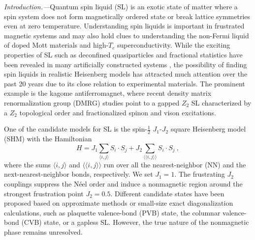 \documentclass[prl,aps,epsf,showpacs,twocolumn]{revtex4}
\begin{document}
\textit{Introduction.---}Quantum spin liquid (SL) is an exotic state of matter where a spin system does not form magnetically ordered state or break lattice symmetries even at zero temperature\cite{Nature_464_199}.
Understanding spin liquids is important in frustrated magnetic systems and may also hold clues to understanding the non-Fermi liquid of doped Mott materials and high-$T_c$ superconductivity\cite{RMP_78_17}.
While the exciting properties of SL such as deconfined quasiparticles and fractional statistics have been revealed in many artificially constructed systems \cite{PRL_86_1881, PRB_64_064422, PRB_66_205104,PRB_65_224412, PRL_94_146805, PRL_97_207204, NP_7_772, 1309_5669,AP_321_2,PRL_108_247206}, the possibility of finding spin liquids in realistic Heisenberg models has attracted much attention over the past 20 years due to its close relation to experimental materials.
The prominent example is the kagome antiferromagnet, where recent density matrix renormalization group (DMRG) studies
point to a gapped $Z_2$ SL\cite{PRL_101_117203,Science_332_1173,PRL_109_067201,NP_8_902, 1309_5669}
characterized by a $Z_2$ topological order and fractionalized spinon and vison excitations\cite{PRL_66_1773,PRB_44_2664, PRB_40_7387, PRB_60_1654,PRB_62_7850}.

One of the candidate models for SL is the spin-$\frac{1}{2}$ $J_1$-$J_2$ square Heisenberg model (SHM) with the Hamiltonian
\begin{equation}
H = J_1 \sum_{\langle i,j\rangle}S_i\cdot S_j + J_2 \sum_{\langle\langle i,j\rangle\rangle}S_i \cdot S_j ~,
\end{equation}
where the sums $\langle i,j\rangle$ and $\langle\langle i,j\rangle\rangle$ run over all the nearest-neighbor (NN) and the next-nearest-neighbor bonds, respectively. We set $J_1=1$.
The frustrating $J_2$ couplings suppress the N\'{e}el order and induce a nonmagnetic region around the strongest frustration point $J_2=0.5$\cite{PRB_38_9335,IJMP_02_203,PRB_41_9323,PRB_44_12050,PRB_54_9007,PRL_78_2216,PRB_60_7278,PRL_84_3173,PRL_87_097201,PRL_91_067201,PRL_91_197202,PRB_74_144422,PRB_78_214415,PRB_79_024409,EPJB_73_117,PRB_81_144410,PRB_85_094407,1112_3331,PRB_86_024424,PRB_79_224431,PRB_86_045115,PRB_86_075111,PRL_111_037202,PRB_88_060402,1309.6490,1308.2759}.
Different candidate states have been proposed based on approximate methods or small-size exact diagonalization calculations, such as plaquette valence-bond (PVB) state\cite{PRB_54_9007,PRL_84_3173,PRL_91_197202,PRB_74_144422,PRB_79_024409,PRB_85_094407,1309.6490}, the columnar valence-bond (CVB) state\cite{PRB_41_9323,PRB_44_12050,PRB_60_7278}, or a gapless SL\cite{PRL_87_097201,PRL_91_067201,PRL_111_037202,PRB_88_060402}.  However, the true nature of the nonmagnetic phase remains unresolved.
\end{document}
